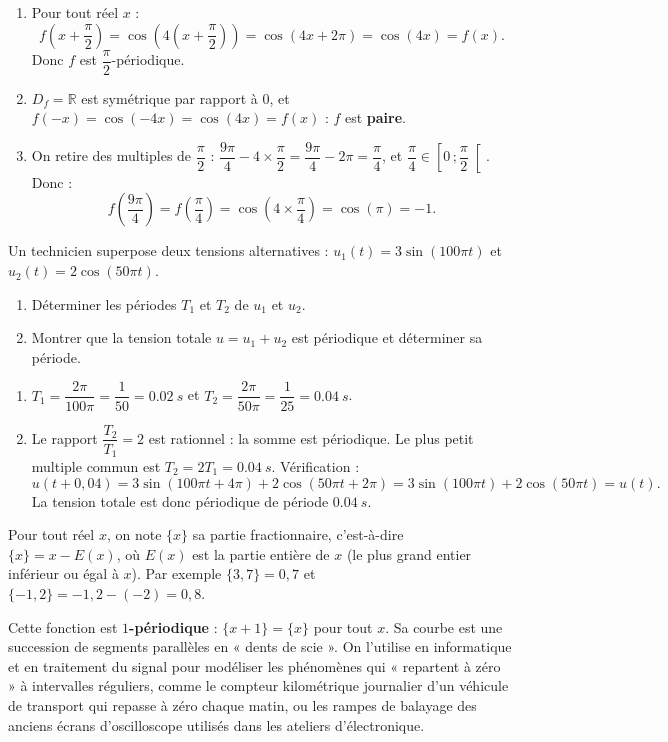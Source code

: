 \documentclass[11pt]{article}
\newcommand{\cle}[1]{{\popxbold\color{popdark}#1}}
\begin{document}
\begin{corrige}[Exercice 1]
\begin{enumerate}
\item Pour tout réel $x$ :
\[ f\left(x+\frac{\pi}{2}\right)=\cos\left(4\left(x+\frac{\pi}{2}\right)\right)=\cos(4x+2\pi)=\cos(4x)=f(x). \]
Donc $f$ est $\dfrac{\pi}{2}$-périodique.
\item $D_f=\mathbb{R}$ est symétrique par rapport à $0$, et $f(-x)=\cos(-4x)=\cos(4x)=f(x)$ : $f$ est \textbf{paire}.
\item On retire des multiples de $\dfrac{\pi}{2}$ : $\dfrac{9\pi}{4}-4\times\dfrac{\pi}{2}=\dfrac{9\pi}{4}-2\pi=\dfrac{\pi}{4}$, et $\dfrac{\pi}{4}\in\left[0\,;\dfrac{\pi}{2}\right[$. Donc :
\[ f\left(\frac{9\pi}{4}\right)=f\left(\frac{\pi}{4}\right)=\cos\left(4\times\frac{\pi}{4}\right)=\cos(\pi)=-1. \]
\end{enumerate}
\end{corrige}

\begin{exercice}
Un technicien superpose deux tensions alternatives : $u_1(t)=3\sin(100\pi t)$ et $u_2(t)=2\cos(50\pi t)$.
\begin{enumerate}
\item Déterminer les périodes $T_1$ et $T_2$ de $u_1$ et $u_2$.
\item Montrer que la tension totale $u=u_1+u_2$ est périodique et déterminer sa période.
\end{enumerate}
\end{exercice}

\begin{corrige}[Exercice 2]
\begin{enumerate}
\item $T_1=\dfrac{2\pi}{100\pi}=\dfrac{1}{50}=\SI{0,02}{s}$ et $T_2=\dfrac{2\pi}{50\pi}=\dfrac{1}{25}=\SI{0,04}{s}$.
\item Le rapport $\dfrac{T_2}{T_1}=2$ est rationnel : la somme est périodique. Le plus petit multiple commun est $T_2=2T_1=\SI{0,04}{s}$. Vérification :
\[ u(t+0{,}04)=3\sin(100\pi t+4\pi)+2\cos(50\pi t+2\pi)=3\sin(100\pi t)+2\cos(50\pi t)=u(t). \]
La tension totale est donc périodique de période $\SI{0,04}{s}$.
\end{enumerate}
\end{corrige}

\begin{savaistu}
Pour tout réel $x$, on note $\{x\}$ sa \cle{partie fractionnaire}, c'est-à-dire $\{x\}=x-E(x)$, où $E(x)$ est la partie entière de $x$ (le plus grand entier inférieur ou égal à $x$). Par exemple $\{3{,}7\}=0{,}7$ et $\{-1{,}2\}=-1{,}2-(-2)=0{,}8$.

Cette fonction est \textbf{$1$-périodique} : $\{x+1\}=\{x\}$ pour tout $x$. Sa courbe est une succession de segments parallèles en « dents de scie ». On l'utilise en informatique et en traitement du signal pour modéliser les phénomènes qui « repartent à zéro » à intervalles réguliers, comme le compteur kilométrique journalier d'un véhicule de transport qui repasse à zéro chaque matin, ou les rampes de balayage des anciens écrans d'oscilloscope utilisés dans les ateliers d'électronique.
\end{savaistu}
\end{document}
